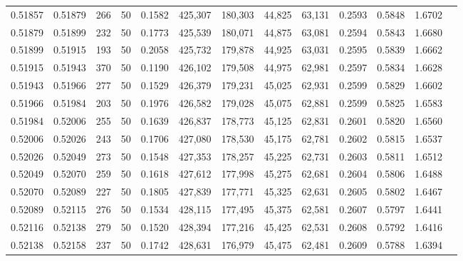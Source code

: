 \begin{tabular}{rrrrrrrrrrrrr}
0.51857 & 0.51879 &   266 &  50 &                                     0.1582 & 425,307 & 180,303 &  44,825 &  63,131 & 0.2593 & 0.5848 & 1.6702 \\
0.51879 & 0.51899 &   232 &  50 &                                     0.1773 & 425,539 & 180,071 &  44,875 &  63,081 & 0.2594 & 0.5843 & 1.6680 \\
0.51899 & 0.51915 &   193 &  50 &                                     0.2058 & 425,732 & 179,878 &  44,925 &  63,031 & 0.2595 & 0.5839 & 1.6662 \\
0.51915 & 0.51943 &   370 &  50 &                                     0.1190 & 426,102 & 179,508 &  44,975 &  62,981 & 0.2597 & 0.5834 & 1.6628 \\
0.51943 & 0.51966 &   277 &  50 &                                     0.1529 & 426,379 & 179,231 &  45,025 &  62,931 & 0.2599 & 0.5829 & 1.6602 \\
0.51966 & 0.51984 &   203 &  50 &                                     0.1976 & 426,582 & 179,028 &  45,075 &  62,881 & 0.2599 & 0.5825 & 1.6583 \\
0.51984 & 0.52006 &   255 &  50 &                                     0.1639 & 426,837 & 178,773 &  45,125 &  62,831 & 0.2601 & 0.5820 & 1.6560 \\
0.52006 & 0.52026 &   243 &  50 &                                     0.1706 & 427,080 & 178,530 &  45,175 &  62,781 & 0.2602 & 0.5815 & 1.6537 \\
0.52026 & 0.52049 &   273 &  50 &                                     0.1548 & 427,353 & 178,257 &  45,225 &  62,731 & 0.2603 & 0.5811 & 1.6512 \\
0.52049 & 0.52070 &   259 &  50 &                                     0.1618 & 427,612 & 177,998 &  45,275 &  62,681 & 0.2604 & 0.5806 & 1.6488 \\
0.52070 & 0.52089 &   227 &  50 &                                     0.1805 & 427,839 & 177,771 &  45,325 &  62,631 & 0.2605 & 0.5802 & 1.6467 \\
0.52089 & 0.52115 &   276 &  50 &                                     0.1534 & 428,115 & 177,495 &  45,375 &  62,581 & 0.2607 & 0.5797 & 1.6441 \\
0.52116 & 0.52138 &   279 &  50 &                                     0.1520 & 428,394 & 177,216 &  45,425 &  62,531 & 0.2608 & 0.5792 & 1.6416 \\
0.52138 & 0.52158 &   237 &  50 &                                     0.1742 & 428,631 & 176,979 &  45,475 &  62,481 & 0.2609 & 0.5788 & 1.6394 \\

\end{tabular}
